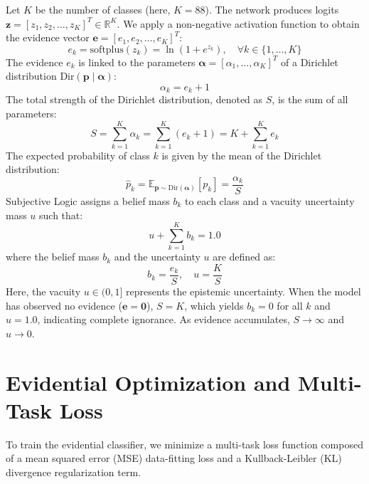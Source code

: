 \documentclass[11pt,journal,onecolumn]{IEEEtran}
\begin{document}
Let $K$ be the number of classes (here, $K = 88$). The network produces logits $\mathbf{z} = [z_1, z_2, \dots, z_K]^T \in \mathbb{R}^K$. We apply a non-negative activation function to obtain the evidence vector $\mathbf{e} = [e_1, e_2, \dots, e_K]^T$:
\begin{equation}
    e_k = \text{softplus}(z_k) = \ln(1 + e^{z_k}), \quad \forall k \in \{1, \dots, K\}
\end{equation}
The evidence $e_k$ is linked to the parameters $\boldsymbol{\alpha} = [\alpha_1, \dots, \alpha_K]^T$ of a Dirichlet distribution $\text{Dir}(\mathbf{p} \mid \boldsymbol{\alpha})$:
\begin{equation}
    \alpha_k = e_k + 1
\end{equation}
The total strength of the Dirichlet distribution, denoted as $S$, is the sum of all parameters:
\begin{equation}
    S = \sum_{k=1}^K \alpha_k = \sum_{k=1}^K (e_k + 1) = K + \sum_{k=1}^K e_k
\end{equation}
The expected probability of class $k$ is given by the mean of the Dirichlet distribution:
\begin{equation}
    \hat{p}_k = \mathbb{E}_{\mathbf{p} \sim \text{Dir}(\boldsymbol{\alpha})}[p_k] = \frac{\alpha_k}{S}
\end{equation}
Subjective Logic assigns a belief mass $b_k$ to each class and a vacuity uncertainty mass $u$ such that:
\begin{equation}
    u + \sum_{k=1}^K b_k = 1.0
\end{equation}
where the belief mass $b_k$ and the uncertainty $u$ are defined as:
\begin{equation}
    b_k = \frac{e_k}{S}, \quad u = \frac{K}{S}
\end{equation}
Here, the vacuity $u \in (0, 1]$ represents the epistemic uncertainty. When the model has observed no evidence ($\mathbf{e} = \mathbf{0}$), $S = K$, which yields $b_k = 0$ for all $k$ and $u = 1.0$, indicating complete ignorance. As evidence accumulates, $S \to \infty$ and $u \to 0$.

\section{Evidential Optimization and Multi-Task Loss}
To train the evidential classifier, we minimize a multi-task loss function composed of a mean squared error (MSE) data-fitting loss and a Kullback-Leibler (KL) divergence regularization term.
\end{document}
